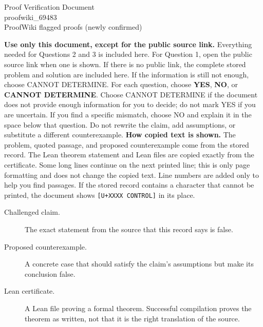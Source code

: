 \documentclass[11pt]{article}
\begin{document}
\begin{center}{\LARGE Proof Verification Document}\\[2pt]{\large proofwiki\_69483}\\[2pt]{\small ProofWiki flagged proofs (newly confirmed)}\end{center}
\begin{center}\end{center}
\textbf{Use only this document, except for the public source link.} Everything needed for Questions 2 and 3 is included here. For Question 1, open the public source link when one is shown. If there is no public link, the complete stored problem and solution are included here. If the information is still not enough, choose CANNOT DETERMINE.
For each question, choose \textbf{YES}, \textbf{NO}, or \textbf{CANNOT DETERMINE}. Choose CANNOT DETERMINE if the document does not provide enough information for you to decide; do not mark YES if you are uncertain. If you find a specific mismatch, choose NO and explain it in the space below that question. Do not rewrite the claim, add assumptions, or substitute a different counterexample.
\textbf{How copied text is shown.} The problem, quoted passage, and proposed counterexample come from the stored record. The Lean theorem statement and Lean files are copied exactly from the certificate. Some long lines continue on the next printed line; this is only page formatting and does not change the copied text. Line numbers are added only to help you find passages. If the stored record contains a character that cannot be printed, the document shows \texttt{[U+XXXX CONTROL]} in its place.
\begin{description}
\item[Challenged claim.] The exact statement from the source that this record says is false.
\item[Proposed counterexample.] A concrete case that should satisfy the claim's assumptions but make its conclusion false.
\item[Lean certificate.] A Lean file proving a formal theorem. Successful compilation proves the theorem as written, not that it is the right translation of the source.
\end{description}
\end{document}
